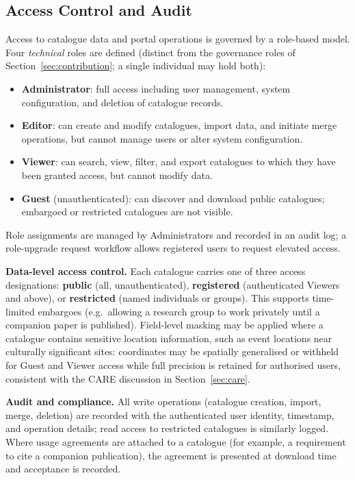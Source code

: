 \documentclass[11pt]{article}
\begin{document}
\subsection{Access Control and Audit}
Access to catalogue data and portal operations is governed by a role-based model. Four \emph{technical} roles are defined (distinct from the governance roles of Section~\ref{sec:contribution}; a single individual may hold both):
\begin{itemize}
  \item \textbf{Administrator}: full access including user management, system configuration, and deletion of catalogue records.
  \item \textbf{Editor}: can create and modify catalogues, import data, and initiate merge operations, but cannot manage users or alter system configuration.
  \item \textbf{Viewer}: can search, view, filter, and export catalogues to which they have been granted access, but cannot modify data.
  \item \textbf{Guest} (unauthenticated): can discover and download public catalogues; embargoed or restricted catalogues are not visible.
\end{itemize}
Role assignments are managed by Administrators and recorded in an audit log; a role-upgrade request workflow allows registered users to request elevated access.

\textbf{Data-level access control.} Each catalogue carries one of three access designations: \textbf{public} (all, unauthenticated), \textbf{registered} (authenticated Viewers and above), or \textbf{restricted} (named individuals or groups). This supports time-limited embargoes (e.g.\ allowing a research group to work privately until a companion paper is published). Field-level masking may be applied where a catalogue contains sensitive location information, such as event locations near culturally significant sites: coordinates may be spatially generalised or withheld for Guest and Viewer access while full precision is retained for authorised users, consistent with the CARE discussion in Section~\ref{sec:care}.

\textbf{Audit and compliance.} All write operations (catalogue creation, import, merge, deletion) are recorded with the authenticated user identity, timestamp, and operation details; read access to restricted catalogues is similarly logged. Where usage agreements are attached to a catalogue (for example, a requirement to cite a companion publication), the agreement is presented at download time and acceptance is recorded.
\end{document}
